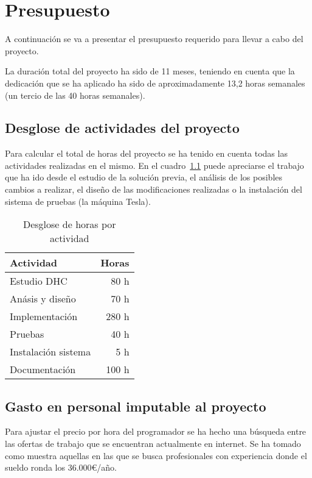 \chapter{Presupuesto}

A continuación se va a presentar el presupuesto requerido para llevar a cabo del proyecto.

La duración total del proyecto ha sido de 11 meses, teniendo en cuenta que la dedicación que se ha aplicado ha sido de aproximadamente 13,2 horas semanales (un tercio de las 40 horas semanales).

\section{Desglose de actividades del proyecto}

Para calcular el total de horas del proyecto se ha tenido en cuenta todas las actividades realizadas en el mismo. En el cuadro~\ref{tab:des_horas} puede apreciarse el trabajo que ha ido desde el estudio de la solución previa, el análisis de los posibles cambios a realizar, el diseño de las modificaciones realizadas o la instalación del sistema de pruebas (la máquina Tesla).

\begin{table}
	\centering
	
	\begin{tabular}{|l|r|}
		\hline
		Actividad & Horas \\
		\hline
		Estudio DHC & 80 h \\
		\hline
		Anásis y diseño & 70 h \\
		\hline
		Implementación & 280 h \\
		\hline
		Pruebas & 40 h \\
		\hline
		Instalación sistema & 5 h \\
		\hline
		Documentación & 100 h \\
		\hline
	\end{tabular}
	\caption{Desglose de horas por actividad}\label{tab:des_horas}
\end{table}

\section{Gasto en personal imputable al proyecto}

Para ajustar el precio por hora del programador se ha hecho una búsqueda entre las ofertas de trabajo que se encuentran actualmente en internet. Se ha tomado como muestra aquellas en las que se busca profesionales con experiencia donde el sueldo ronda los 36.000\euro/año.

